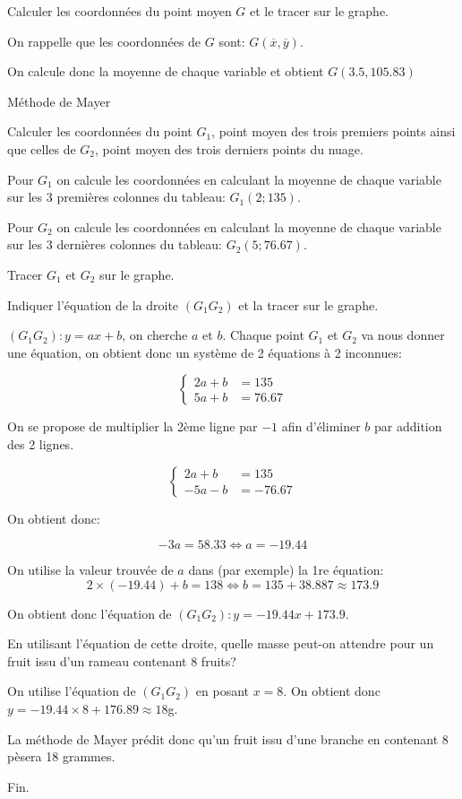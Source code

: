 \documentclass[a4paper,12pt]{scrartcl}
\begin{document}
\question{}
Calculer les coordonnées du point moyen $G$ et le tracer sur le graphe.

On rappelle que les coordonnées de $G$ sont: $G(\overline{x},\overline{y})$.

On calcule donc la moyenne de chaque variable et obtient $G(3.5,105.83)$

\question{}
Méthode de Mayer

\subquestion{}
Calculer les coordonnées du point $G_1$, point moyen des trois premiers points ainsi que celles de $G_2$, point moyen des trois derniers points du nuage. 

Pour $G_1$ on calcule les coordonnées en calculant la moyenne de chaque variable sur les 3 premières colonnes du tableau: $G_1(2;135)$.

Pour $G_2$ on calcule les coordonnées en calculant la moyenne de chaque variable sur les 3 dernières colonnes du tableau: $G_2(5;76.67)$.

\subquestion{}
Tracer $G_1$ et $G_2$ sur le graphe.

\subquestion{}
Indiquer l'équation de la droite $(G_1 G_2)$ et la tracer sur le graphe. 

$(G_1 G_2):y=ax+b$, on cherche $a$ et $b$. Chaque point $G_1$ et $G_2$ va nous donner une équation, on obtient donc un système de 2 équations à 2 inconnues:

$$
\begin{cases} 
2 a + b &= 135 \\
5 a + b &= 76.67
\end{cases}
$$

On se propose de multiplier la 2ème ligne par $-1$ afin d'éliminer $b$ par addition des 2 lignes.

$$
\begin{cases} 
2 a + b &= 135 \\
-5 a - b &= -76.67
\end{cases}
$$

On obtient donc:

$$-3a = 58.33 \Leftrightarrow a = -19.44$$

On utilise la valeur trouvée de $a$ dans (par exemple) la 1re équation: $$2 \times (-19.44) + b = 138 \Leftrightarrow b = 135 + 38.887 \approx 173.9$$

On obtient donc l'équation de $(G_1 G_2):y = -19.44 x + 173.9$. 

\subquestion{}
En utilisant l'équation de cette droite, quelle masse peut-on attendre pour un fruit issu d'un rameau contenant 8 fruits?

On utilise l'équation de $(G_1 G_2)$ en posant $x=8$. On obtient donc $y = -19.44 \times 8 + 176.89 \approx 18$g.

La méthode de Mayer prédit donc qu'un fruit issu d'une branche en contenant 8 pèsera 18 grammes.

\trait

\begin{center}
Fin.
\end{center}
\end{document}
